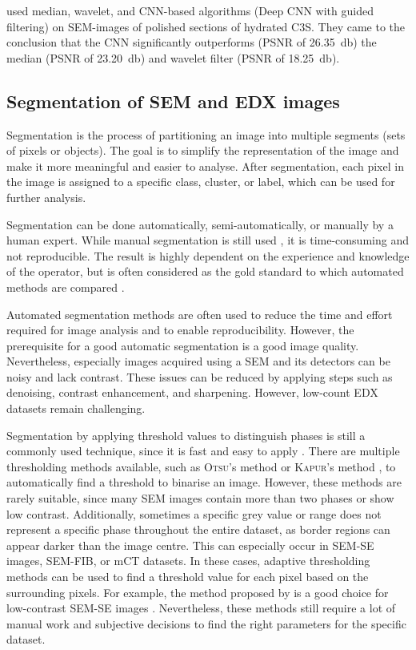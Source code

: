 \textcite{wang.2025} used median, wavelet, and \ac{CNN}-based algorithms (Deep \ac{CNN} with guided filtering) on \ac{SEM}-images of polished sections of hydrated \ac{C3S}.
They came to the conclusion that the \ac{CNN} significantly outperforms (\ac{PSNR} of \qty{26.35}{\decibel}) the median (\ac{PSNR} of \qty{23.20}{\decibel}) and wavelet filter (\ac{PSNR} of \qty{18.25}{\decibel}).

\FloatBarrier
\subsection{Segmentation of \acs*{SEM} and \acs*{EDX} images}
\label{sec:lit_segmentation}

Segmentation is the process of partitioning an image into multiple segments (sets of pixels or objects).
The goal is to simplify the representation of the image and make it more meaningful and easier to analyse.
After segmentation, each pixel in the image is assigned to a specific class, cluster, or label, which can be used for further analysis.

Segmentation can be done automatically, semi-automatically, or manually by a human expert.
While manual segmentation is still used \cite{bajcsy.2020,kleiner.2024a}, it is time-consuming and not reproducible.
The result is highly dependent on the experience and knowledge of the operator, but is often considered as the gold standard to which automated methods are compared \cite{bajcsy.2020}.

Automated segmentation methods are often used to reduce the time and effort required for image analysis and to enable reproducibility.
However, the prerequisite for a good automatic segmentation is a good image quality.
Nevertheless, especially images acquired using a \ac{SEM} and its detectors can be noisy and lack contrast.
These issues can be reduced by applying steps such as denoising, contrast enhancement, and sharpening.
However, low-count \ac{EDX} datasets remain challenging.

Segmentation by applying threshold values to distinguish phases is still a commonly used technique, since it is fast and easy to apply \cite{hlobil.2022}.
There are multiple thresholding methods available, such as \textsc{Otsu}'s method \cite{otsu.1979} or \textsc{Kapur}'s method \cite{kapur.1985}, to automatically find a threshold to binarise an image.
However, these methods are rarely suitable, since many \ac{SEM} images contain more than two phases or show low contrast.
Additionally, sometimes a specific grey value or range does not represent a specific phase throughout the entire dataset, as border regions can appear darker than the image centre.
This can especially occur in \ac{SEM}-\ac{SE} images, \ac{SEM}-\ac{FIB}, or \ac{mCT} datasets.
In these cases, adaptive thresholding methods \cite{sauvola.2000, phansalkar.2011} can be used to find a threshold value for each pixel based on the surrounding pixels.
For example, the method proposed by \textcite{phansalkar.2011} is a good choice for low-contrast \ac{SEM}-\ac{SE} images \cite{kleiner.2021a}.
Nevertheless, these methods still require a lot of manual work and subjective decisions to find the right parameters for the specific dataset.

